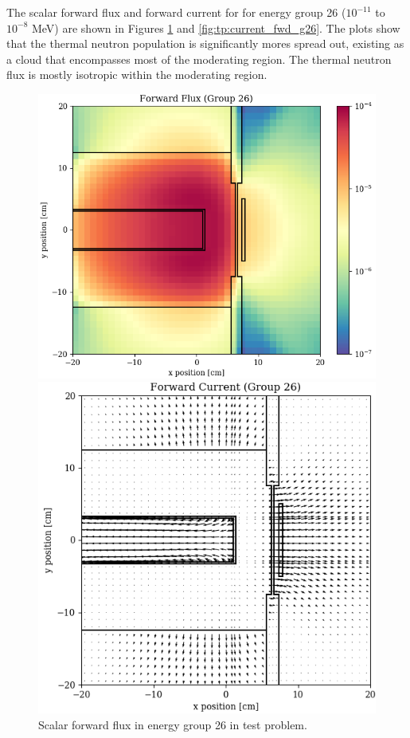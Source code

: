The scalar forward flux and forward current for for energy group 26 ($10^{-11}$ to $10^{-8}$ MeV) are shown in Figures \ref{fig:tp:scalar_flux_fwd_g26} and \ref{fig:tp:current_fwd_g26}.
The plots show that the thermal neutron population is significantly mores spread out, existing as a cloud that encompasses most of the moderating region.
The thermal neutron flux is mostly isotropic within the moderating region.

\begin{figure}
  \begin{minipage}{0.49\linewidth}
    \centering
    \includegraphics[width=\linewidth]{content/testprob/scalar_flux_fwd_g26.png}
    \caption{Scalar forward flux in energy group 26 in test problem.}
    \label{fig:tp:scalar_flux_fwd_g26}
  \end{minipage}
  \hfill
  \begin{minipage}{0.49\linewidth}
    \centering
    \includegraphics[width=\linewidth]{content/testprob/current_fwd_g26.png}

\end{minipage}
\end{figure}
